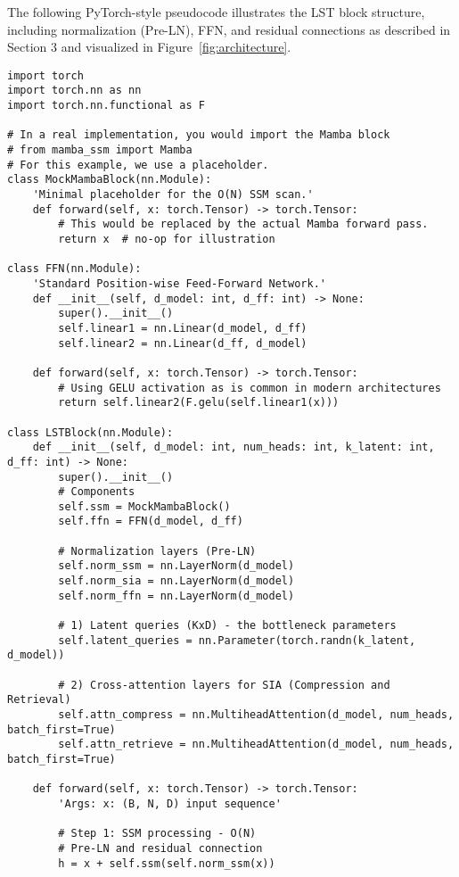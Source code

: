 \documentclass[10pt,twocolumn,letterpaper]{article}
\begin{document}
The following PyTorch-style pseudocode illustrates the LST block structure, including normalization (Pre-LN), FFN, and residual connections as described in Section 3 and visualized in Figure~\ref{fig:architecture}.

\begin{lstlisting}[style=pytorchstyle, caption={PyTorch-style pseudocode for the LST Block.}, label=lst:code_block]
import torch
import torch.nn as nn
import torch.nn.functional as F

# In a real implementation, you would import the Mamba block
# from mamba_ssm import Mamba
# For this example, we use a placeholder.
class MockMambaBlock(nn.Module):
    'Minimal placeholder for the O(N) SSM scan.'
    def forward(self, x: torch.Tensor) -> torch.Tensor:
        # This would be replaced by the actual Mamba forward pass.
        return x  # no-op for illustration

class FFN(nn.Module):
    'Standard Position-wise Feed-Forward Network.'
    def __init__(self, d_model: int, d_ff: int) -> None:
        super().__init__()
        self.linear1 = nn.Linear(d_model, d_ff)
        self.linear2 = nn.Linear(d_ff, d_model)

    def forward(self, x: torch.Tensor) -> torch.Tensor:
        # Using GELU activation as is common in modern architectures
        return self.linear2(F.gelu(self.linear1(x)))

class LSTBlock(nn.Module):
    def __init__(self, d_model: int, num_heads: int, k_latent: int, d_ff: int) -> None:
        super().__init__()
        # Components
        self.ssm = MockMambaBlock()
        self.ffn = FFN(d_model, d_ff)

        # Normalization layers (Pre-LN)
        self.norm_ssm = nn.LayerNorm(d_model)
        self.norm_sia = nn.LayerNorm(d_model)
        self.norm_ffn = nn.LayerNorm(d_model)

        # 1) Latent queries (KxD) - the bottleneck parameters
        self.latent_queries = nn.Parameter(torch.randn(k_latent, d_model))

        # 2) Cross-attention layers for SIA (Compression and Retrieval)
        self.attn_compress = nn.MultiheadAttention(d_model, num_heads, batch_first=True)
        self.attn_retrieve = nn.MultiheadAttention(d_model, num_heads, batch_first=True)

    def forward(self, x: torch.Tensor) -> torch.Tensor:
        'Args: x: (B, N, D) input sequence'

        # Step 1: SSM processing - O(N)
        # Pre-LN and residual connection
        h = x + self.ssm(self.norm_ssm(x))


\end{lstlisting}
\end{document}

